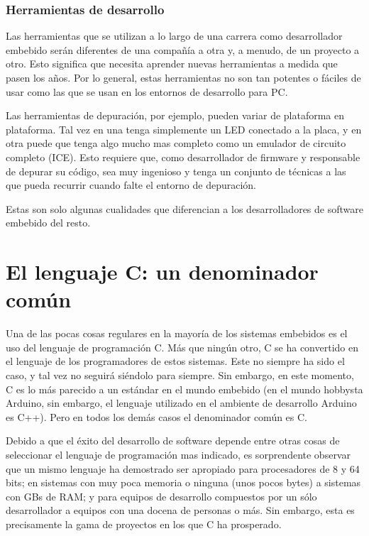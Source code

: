 \documentclass[output=paper, 
colorlinks,
citecolor=brown,
newtxmath
]{langscibook}
\begin{document}
\subsubsection {Herramientas de desarrollo}

Las herramientas que se utilizan a lo largo de una carrera 
como desarrollador embebido serán diferentes de una compañía a otra y, 
a menudo, de un proyecto a otro. Esto significa que necesita
aprender nuevas herramientas a medida que pasen los años.
Por lo general, estas herramientas no son tan potentes 
o fáciles de usar como las que se usan en los entornos
de desarrollo para PC.

Las herramientas de depuración, por ejemplo, pueden variar de plataforma
en plataforma. Tal vez en una tenga simplemente un LED conectado a la placa,
y en otra puede que tenga algo mucho mas completo como un emulador de 
circuito completo (ICE). Esto requiere que, como desarrollador de 
firmware y responsable de depurar 
su código, sea muy ingenioso y tenga un conjunto de técnicas a las que 
pueda recurrir cuando falte el entorno de depuración. 

Estas son solo algunas cualidades que diferencian a los desarrolladores 
de software embebido del resto.



\section {El lenguaje C: un denominador común}

Una de las pocas cosas regulares en la mayoría de los sistemas embebidos es el uso del 
lenguaje de programación C.
Más que ningún otro, C se ha convertido en el lenguaje de los programadores de estos sistemas. 
Este no siempre ha sido el caso, y tal vez no seguirá siéndolo para siempre. 
Sin embargo, en este momento, C es lo más parecido a un estándar en el mundo embebido (en el mundo hobbysta Arduino, sin embargo, el lenguaje utilizado en el ambiente de desarrollo Arduino es C++). Pero en todos los demás casos el denominador común es C. 

Debido a que el éxito del desarrollo de software depende entre otras cosas de seleccionar 
el lenguaje de programación mas indicado, es sorprendente observar que 
un mismo lenguaje ha demostrado ser apropiado para procesadores de 8 y 64 bits; 
en sistemas con muy poca memoria o ninguna (unos pocos bytes) a sistemas
con GBs de RAM; y para equipos de desarrollo compuestos por un sólo desarrollador 
a equipos con una docena de personas o más. 
Sin embargo, esta es precisamente la gama de proyectos en los que C ha prosperado.
\end{document}
